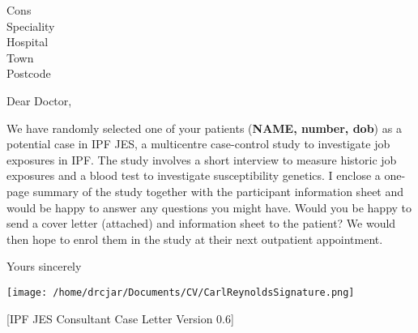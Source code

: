 \documentclass[imperial,letterpaper,pagesize,UScommercial9]{scrlttr2}
\begin{document}
\begin{letter}{Cons \\ Speciality \\ Hospital \\ Town \\ Postcode}


\opening{Dear Doctor,}

    We have randomly selected one of your patients (\textbf{NAME, number, dob}) as a potential case in IPF JES, a multicentre case-control study to investigate job exposures in IPF.
    The study involves a short interview to measure historic job exposures and a blood test to investigate susceptibility genetics. I enclose a one-page summary of the study together with the participant information sheet and would be happy to answer any questions you might have.
    Would you be happy to send a cover letter (attached) and information sheet to the patient? We would then hope to enrol them in the study at their next outpatient appointment.



\closing{Yours sincerely}

    \texttt{[image: /home/drcjar/Documents/CV/CarlReynoldsSignature.png]}

     \vfill \hfill [IPF JES Consultant Case Letter Version 0.6]

\end{letter}
\end{document}

